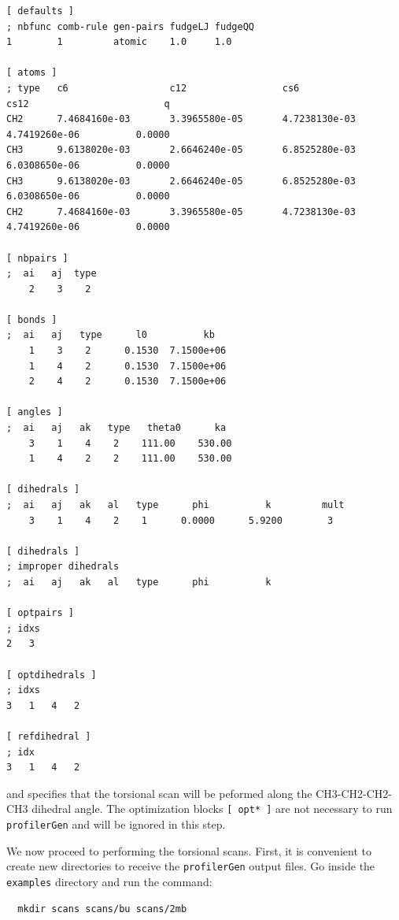 \documentclass[10pt,a4paper,openany]{memoir}
\numberwithin{equation}{section}
\newcommand{\profilergen}[0]{\texttt{profilerGen}}
\begin{document}
\begin{lstlisting}[language=gromacs]
[ defaults ]
; nbfunc comb-rule gen-pairs fudgeLJ fudgeQQ
1        1         atomic    1.0     1.0

[ atoms ]
; type   c6                  c12                 cs6                 cs12                        q
CH2      7.4684160e-03       3.3965580e-05       4.7238130e-03       4.7419260e-06          0.0000
CH3      9.6138020e-03       2.6646240e-05       6.8525280e-03       6.0308650e-06          0.0000
CH3      9.6138020e-03       2.6646240e-05       6.8525280e-03       6.0308650e-06          0.0000
CH2      7.4684160e-03       3.3965580e-05       4.7238130e-03       4.7419260e-06          0.0000

[ nbpairs ]
;  ai   aj  type
    2    3    2     

[ bonds ]
;  ai   aj   type      l0          kb
    1    3    2      0.1530  7.1500e+06 
    1    4    2      0.1530  7.1500e+06 
    2    4    2      0.1530  7.1500e+06 

[ angles ]
;  ai   aj   ak   type   theta0      ka
    3    1    4    2    111.00    530.00 
    1    4    2    2    111.00    530.00 

[ dihedrals ]
;  ai   aj   ak   al   type      phi          k         mult
    3    1    4    2    1      0.0000      5.9200        3 

[ dihedrals ]
; improper dihedrals
;  ai   aj   ak   al   type      phi          k         

[ optpairs ]
; idxs
2   3   

[ optdihedrals ]
; idxs
3   1   4   2   

[ refdihedral ]
; idx
3   1   4   2
\end{lstlisting}\vspace{2ex}\par

\noindent 
%
and specifies that the torsional scan will be peformed along the
CH3-CH2-CH2-CH3 dihedral angle.
%
The optimization blocks \texttt{[~opt*~]} are not necessary to run
\profilergen{} and will be ignored in this step.

We now proceed to performing the torsional scans.
%
First, it is convenient to create new directories to receive the
\profilergen{} output files. Go inside the \texttt{examples} directory
and run the command:

\begin{lstlisting}
  mkdir scans scans/bu scans/2mb
\end{lstlisting}
\vspace{1ex}\par
\end{document}
